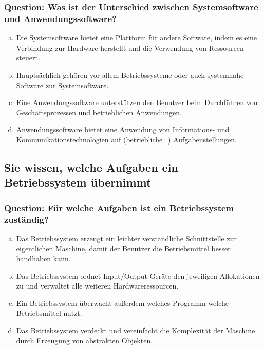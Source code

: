 \documentclass{article}
\begin{document}
\begin{adjustwidth}{2em}{2em}
\begin{adjustwidth}{2em}{2em}
\begin{adjustwidth}{1em}{}
				\subsubsection*{Question: Was ist der Unterschied zwischen Systemsoftware und Anwendungssoftware?}
				\begin{adjustwidth}{1em}{}
					\begin{enumerate}[(a)]
						\item Die Systemsoftware bietet eine Plattform für andere Software, indem es eine Verbindung zur Hardware herstellt und die Verwendung von Ressourcen steuert.
						\item Hauptsächlich gehören vor allem Betriebssysteme oder auch systemnahe Software zur Systemsoftware.
						\item Eine Anwendungssoftware unterstützen den Benutzer beim Durchführen von Geschäftsprozessen und betrieblichen Anwendungen.
						\item Anwendungssoftware bietet eine Anwendung von Informations- und Kommunikationstechnologien auf (betriebliche=) Aufgabenstellungen.
					\end{enumerate}
				\end{adjustwidth}
			\end{adjustwidth}
			\subsection{Sie wissen, welche Aufgaben ein Betriebssystem übernimmt}
			\begin{adjustwidth}{1em}{}
				\subsubsection*{Question: Für welche Aufgaben ist ein Betriebssystem zuständig?}
				\begin{adjustwidth}{1em}{}
					\begin{enumerate}[(a)]
						\item Das Betriebssystem erzeugt ein leichter verständliche Schnittstelle zur eigentlichen Maschine, damit der Benutzer die Betriebsmittel besser handhaben kann.
						\item Das Betriebssystem ordnet Input/Output-Geräte den jeweiligen Allokationen zu und verwaltet alle weiteren Hardwareressourcen.
						\item Ein Betriebssystem überwacht außerdem welches Programm welche Betriebsmittel nutzt.
						\item Das Betriebssystem verdeckt und vereinfacht die Komplexität der Maschine durch Erzeugung von abstrakten Objekten.
					\end{enumerate}
				\end{adjustwidth}
			\end{adjustwidth}

\end{adjustwidth}
\end{adjustwidth}
\end{document}
